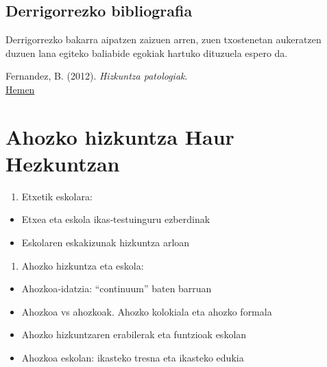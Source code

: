 \documentclass[
]{book}
\providecommand{\tightlist}{%
  \setlength{\itemsep}{0pt}\setlength{\parskip}{0pt}}
\begin{document}
\hypertarget{derrigorrezko-bibliografia}{%
\section{Derrigorrezko bibliografia}\label{derrigorrezko-bibliografia}}

Derrigorrezko bakarra aipatzen zaizuen arren, zuen txostenetan aukeratzen duzuen lana egiteko baliabide egokiak hartuko dituzuela espero da.

Fernandez, B. (2012). \emph{Hizkuntza patologiak}.\\
\href{../Baliabideak/Fernandez-2012-hizkuntza-patologiak-eta-afasiak-garbi-.pdf}{Hemen}

\hypertarget{ahozko-hizkuntza-haur-hezkuntzan}{%
\chapter{Ahozko hizkuntza Haur Hezkuntzan}\label{ahozko-hizkuntza-haur-hezkuntzan}}

\begin{enumerate}
\def\labelenumi{\arabic{enumi}.}
\tightlist
\item
  Etxetik eskolara:\\
\end{enumerate}

\begin{itemize}
\tightlist
\item
  Etxea eta eskola ikas‐testuinguru ezberdinak
\item
  Eskolaren eskakizunak hizkuntza arloan
\end{itemize}

\begin{enumerate}
\def\labelenumi{\arabic{enumi}.}
\setcounter{enumi}{1}
\tightlist
\item
  Ahozko hizkuntza eta eskola:\\
\end{enumerate}

\begin{itemize}
\tightlist
\item
  Ahozkoa‐idatzia: ``continuum'' baten barruan
\item
  Ahozkoa vs ahozkoak. Ahozko kolokiala eta ahozko formala
\item
  Ahozko hizkuntzaren erabilerak eta funtzioak eskolan
\item
  Ahozkoa eskolan: ikasteko tresna eta ikasteko edukia
\end{itemize}
\end{document}
